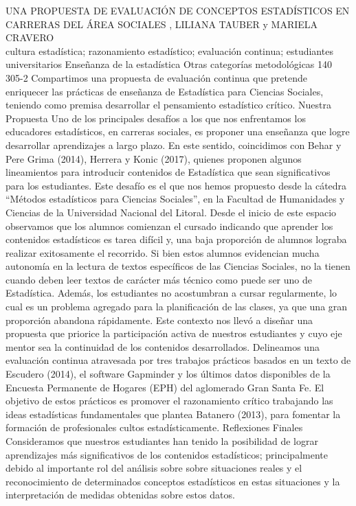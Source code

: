\A
{UNA PROPUESTA DE EVALUACIÓN DE CONCEPTOS ESTADÍSTICOS EN CARRERAS DEL ÁREA SOCIALES}
{, LILIANA TAUBER y MARIELA CRAVERO}
{
\\}
{cultura estadística; razonamiento estadístico; evaluación continua; estudiantes universitarios} 
 {Enseñanza de la estadística} 
 {Otras categorías metodológicas} 
 {140} 
 {305-2}
{Compartimos una propuesta de evaluación continua que pretende enriquecer las prácticas de enseñanza de Estadística para Ciencias Sociales, teniendo como premisa desarrollar el pensamiento estadístico crítico. Nuestra Propuesta Uno de los principales desafíos a los que nos enfrentamos los educadores estadísticos, en carreras sociales, es proponer una enseñanza que logre desarrollar aprendizajes a largo plazo. En este sentido, coincidimos con Behar y Pere Grima (2014), Herrera y Konic (2017), quienes proponen algunos lineamientos para introducir contenidos de Estadística que sean significativos para los estudiantes. Este desafío es el que nos hemos propuesto desde la cátedra “Métodos estadísticos para Ciencias Sociales”, en la Facultad de Humanidades y Ciencias de la Universidad Nacional del Litoral. Desde el inicio de este espacio observamos que los alumnos comienzan el cursado indicando que aprender los contenidos estadísticos es tarea difícil y, una baja proporción de alumnos lograba realizar exitosamente el recorrido. Si bien estos alumnos evidencian mucha autonomía en la lectura de textos específicos de las Ciencias Sociales, no la tienen cuando deben leer textos de carácter más técnico como puede ser uno de Estadística. Además, los estudiantes no acostumbran a cursar regularmente, lo cual es un problema agregado para la planificación de las clases, ya que una gran proporción abandona rápidamente. Este contexto nos llevó a diseñar una propuesta que priorice la participación activa de nuestros estudiantes y cuyo eje mentor sea la continuidad de los contenidos desarrollados. Delineamos una evaluación continua atravesada por tres trabajos prácticos basados en un texto de Escudero (2014), el software Gapminder y los últimos datos disponibles de la Encuesta Permanente de Hogares (EPH) del aglomerado Gran Santa Fe. El objetivo de estos prácticos es promover el razonamiento crítico trabajando las ideas estadísticas fundamentales que plantea Batanero (2013), para fomentar la formación de profesionales cultos estadísticamente. Reflexiones Finales Consideramos que nuestros estudiantes han tenido la posibilidad de lograr aprendizajes más significativos de los contenidos estadísticos; principalmente debido al importante rol del análisis sobre sobre situaciones reales y el reconocimiento de determinados conceptos estadísticos en estas situaciones y la interpretación de medidas obtenidas sobre estos datos. }
